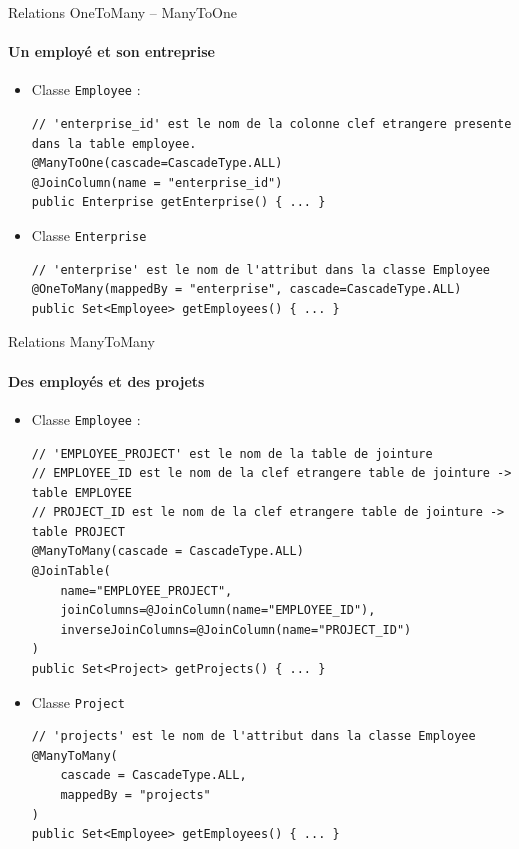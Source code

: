 \documentclass[compress]{beamer}%
\begin{document}
\begin{frame}[fragile]{Relations OneToMany -- ManyToOne}
	\framesubtitle{Un employé et son entreprise}
	
	\begin{itemize}
		\item Classe \texttt{Employee} : 
		\begin{lstlisting}
// 'enterprise_id' est le nom de la colonne clef etrangere presente dans la table employee.
@ManyToOne(cascade=CascadeType.ALL)
@JoinColumn(name = "enterprise_id")
public Enterprise getEnterprise() { ... }
		\end{lstlisting}
	
		\item Classe \texttt{Enterprise}
		\begin{lstlisting}
// 'enterprise' est le nom de l'attribut dans la classe Employee
@OneToMany(mappedBy = "enterprise", cascade=CascadeType.ALL)
public Set<Employee> getEmployees() { ... }
		\end{lstlisting}	
	\end{itemize}

\end{frame}

\begin{frame}[fragile]{Relations ManyToMany}
	\framesubtitle{Des employés et des projets}
	
	\begin{itemize}
		\item Classe \texttt{Employee} : 
		\begin{lstlisting}
// 'EMPLOYEE_PROJECT' est le nom de la table de jointure
// EMPLOYEE_ID est le nom de la clef etrangere table de jointure -> table EMPLOYEE
// PROJECT_ID est le nom de la clef etrangere table de jointure -> table PROJECT
@ManyToMany(cascade = CascadeType.ALL)
@JoinTable(
	name="EMPLOYEE_PROJECT",
	joinColumns=@JoinColumn(name="EMPLOYEE_ID"),
	inverseJoinColumns=@JoinColumn(name="PROJECT_ID")
)
public Set<Project> getProjects() { ... }
		\end{lstlisting}
	
		\item Classe \texttt{Project}
		\begin{lstlisting}
// 'projects' est le nom de l'attribut dans la classe Employee
@ManyToMany(
	cascade = CascadeType.ALL,
	mappedBy = "projects"
)
public Set<Employee> getEmployees() { ... }
		\end{lstlisting}	
	\end{itemize}

\end{frame}
\end{document}
